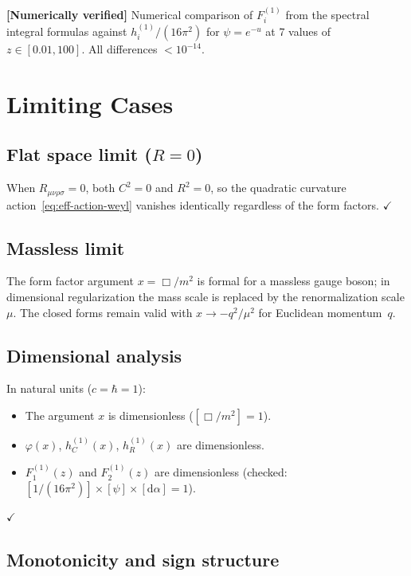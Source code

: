 \documentclass[11pt,a4paper]{article}
\newcommand{\dd}{\mathrm{d}}
\theoremstyle{definition}
\theoremstyle{remark}
\newcommand{\verified}[1]{%
  \par\noindent\colorbox{green!10}{%
    \parbox{\dimexpr\linewidth-2\fboxsep}{%
      \textcolor{green!50!black}{\textbf{[Numerically verified]}}
      \textcolor{green!50!black}{#1}%
    }%
  }\par%
}
\begin{document}
\verified{Numerical comparison of $F_i^{(1)}$ from the spectral
integral formulas against $h_i^{(1)}/(16\pi^2)$ for
$\psi = e^{-u}$ at 7 values of $z \in [0.01, 100]$.
All differences $< 10^{-14}$.}


\section{Limiting Cases}
\label{sec:limits}

\subsection{Flat space limit ($R = 0$)}

When $R_{\mu\nu\rho\sigma} = 0$, both $C^2 = 0$ and $R^2 = 0$,
so the quadratic curvature action~\eqref{eq:eff-action-weyl}
vanishes identically regardless of the form factors.
\quad$\checkmark$


\subsection{Massless limit}

The form factor argument $x = \Box/m^2$ is formal for a massless
gauge boson; in dimensional regularization the mass scale is replaced
by the renormalization scale $\mu$.  The closed forms remain valid
with $x \to -q^2/\mu^2$ for Euclidean momentum~$q$.


\subsection{Dimensional analysis}

In natural units ($c = \hbar = 1$):
\begin{itemize}[nosep]
\item The argument $x$ is dimensionless ($[\Box/m^2] = 1$).
\item $\varphi(x)$, $h_C^{(1)}(x)$, $h_R^{(1)}(x)$ are dimensionless.
\item $F_1^{(1)}(z)$ and $F_2^{(1)}(z)$ are dimensionless
  (checked: $[1/(16\pi^2)] \times [\psi] \times [\dd\alpha] = 1$).
\end{itemize}
\quad$\checkmark$


\subsection{Monotonicity and sign structure}
\end{document}
